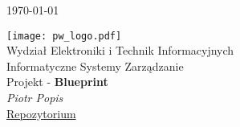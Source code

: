 \begin{titlepage}
	\hfill {\small \today}\\[1cm]
	\begin{center}
		\vspace{-4cm}
		\texttt{[image: pw\_logo.pdf]}\\[0.5cm]
		{\Large Wydział Elektroniki i Technik Informacyjnych}\\[0.5cm]
		{\large Informatyczne Systemy Zarządzanie}\\[2cm]
		{\normalsize Projekt - \textbf{Blueprint}}\\[1.5cm]
		{\Large\itshape Piotr Popis}\\[3cm]
		\hspace*{\fill}
		\small\href{https://github.com/sqoshi/it-management-systemss}{Repozytorium}
	\end{center}
\end{titlepage}